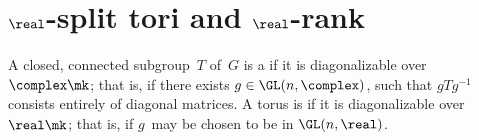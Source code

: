 
 \label{RrankChap}





\section{\texorpdfstring{$\real$}{R}-split tori and \texorpdfstring{$\real$}{R}-rank}

\begin{defn} \label{RsplitDefn}
  A closed, connected subgroup~$T$ of~$G$ is a  if it is diagonalizable
over~$\complex\mk$; that is, if there exists $g \in
\GL(n,\complex)$, such that $g T g^{-1}$ consists entirely
of diagonal matrices. A torus is 
 if it is diagonalizable
over~$\real\mk$; that is, if $g$~may be chosen to be in $\GL(n,\real)$.
 \end{defn}

%

